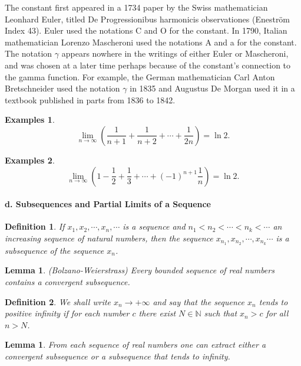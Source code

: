 \documentclass[a4paper,12pt]{article} %
\newtheorem{definition}{Definition}[section]
\newtheorem{lemma}[theorem]{Lemma}
\newtheorem{example}{Examples}
\begin{document}
The constant first appeared in a 1734 paper by the Swiss mathematician 
Leonhard Euler, titled De Progressionibus harmonicis observationes 
(Eneström Index 43). Euler used the notations C and O for the constant. 
In 1790, Italian mathematician Lorenzo Mascheroni used the notations A 
and a for the constant. The notation $\gamma$ appears nowhere in the writings 
of either Euler or Mascheroni, and was chosen at a later time perhaps 
because of the constant's connection to the gamma function. For example,
the German mathematician Carl Anton Bretschneider used the notation 
$\gamma$ in 1835 and Augustus De Morgan used it in a textbook published 
in parts from 1836 to 1842.

\begin{example}
    \[
        \lim_{n \to \infty}\left(\frac{1}{n+1} + \frac{1}{n+2} + \cdots + \frac{1}{2n}\right)
        = \ln 2.
\]\end{example}

\begin{example}
    \[
        \lim_{n \to \infty}\left(1 - \frac{1}{2} + \frac{1}{3} + \cdots + 
        (-1)^{n+1}\frac{1}{n}\right) = \ln 2.
    \]
\end{example}

\paragraph{{\rm \textbf{d. Subsequences and Partial Limits of a Sequence}}}
\begin{definition}
    If $x_1, x_2, \cdots, x_n, \cdots$ is a sequence and $n_1 < n_2 < \cdots <n_k < \cdots$
    an increasing sequence of natural numbers, then the sequence 
    $x_{n_1}, x_{n_2}, \cdots, x_{n_k} \cdots$ is a subsequence of the sequence ${x_n}$.
\end{definition}
\begin{lemma}{(Bolzano-Weierstrass)}
    Every bounded sequence of real numbers contains a convergent subsequence.
\end{lemma}

\begin{definition}
    We shall write $x_n \to +\infty$ and say that the sequence ${x_n}$
    tends to positive infinity if for each number $c$ there exist 
    $N \in \mathbb{N}$ such that $x_n > c$ for all $n > N$.
\end{definition}

\begin{lemma}
    From each sequence of real numbers one can extract either a convergent 
    subsequence or a subsequence that tends to infinity.
\end{lemma}
\end{document}

